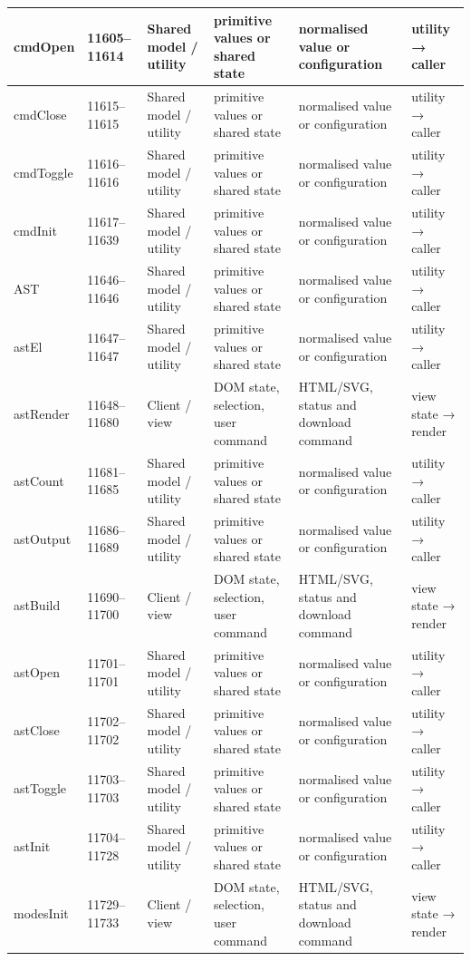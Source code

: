 \begin{landscape}
\begin{longtable}{@{}p{3.2cm}p{1.45cm}p{2.7cm}p{4.0cm}p{4.0cm}p{3.0cm}@{}}
cmdOpen & 11605--11614 & Shared model / utility & primitive values or shared state & normalised value or configuration & utility → caller \\\hline
cmdClose & 11615--11615 & Shared model / utility & primitive values or shared state & normalised value or configuration & utility → caller \\\hline
cmdToggle & 11616--11616 & Shared model / utility & primitive values or shared state & normalised value or configuration & utility → caller \\\hline
cmdInit & 11617--11639 & Shared model / utility & primitive values or shared state & normalised value or configuration & utility → caller \\\hline
AST & 11646--11646 & Shared model / utility & primitive values or shared state & normalised value or configuration & utility → caller \\\hline
astEl & 11647--11647 & Shared model / utility & primitive values or shared state & normalised value or configuration & utility → caller \\\hline
astRender & 11648--11680 & Client / view & DOM state, selection, user command & HTML/SVG, status and download command & view state → render \\\hline
astCount & 11681--11685 & Shared model / utility & primitive values or shared state & normalised value or configuration & utility → caller \\\hline
astOutput & 11686--11689 & Shared model / utility & primitive values or shared state & normalised value or configuration & utility → caller \\\hline
astBuild & 11690--11700 & Client / view & DOM state, selection, user command & HTML/SVG, status and download command & view state → render \\\hline
astOpen & 11701--11701 & Shared model / utility & primitive values or shared state & normalised value or configuration & utility → caller \\\hline
astClose & 11702--11702 & Shared model / utility & primitive values or shared state & normalised value or configuration & utility → caller \\\hline
astToggle & 11703--11703 & Shared model / utility & primitive values or shared state & normalised value or configuration & utility → caller \\\hline
astInit & 11704--11728 & Shared model / utility & primitive values or shared state & normalised value or configuration & utility → caller \\\hline
modesInit & 11729--11733 & Client / view & DOM state, selection, user command & HTML/SVG, status and download command & view state → render \\\hline
\bottomrule\end{longtable}\end{landscape}

